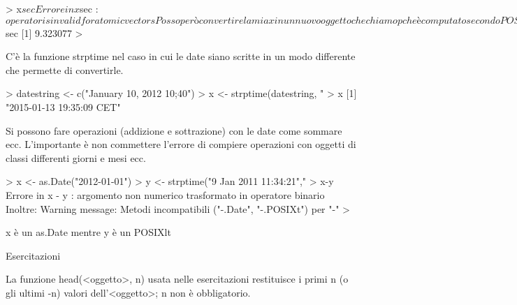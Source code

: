> x$sec
Errore in x$sec : $ operator is invalid for atomic vectors

Posso però convertire la mia x in un nuovo oggetto che chiamo p che è computato secondo POSIXlt dal quale è possibile estrarre i secondi chiamandoli in modo nominale con il dollaro.

> p<-as.POSIXlt(x)
> p$sec
[1] 9.323077
> 

C'è la funzione strptime nel caso in cui le date siano scritte in un modo differente che permette di convertirle.

> datestring <- c("January 10, 2012 10;40")
> x <- strptime(datestring, "%
> x
[1] "2015-01-13 19:35:09 CET"

Si possono fare operazioni (addizione e sottrazione) con le date come sommare ecc.
L'importante è non commettere l'errore di compiere operazioni con oggetti di classi differenti giorni e mesi ecc.

> x <- as.Date("2012-01-01")
> y <- strptime("9 Jan 2011 11:34:21","%
> x-y
Errore in x - y : argomento non numerico trasformato in operatore binario
Inoltre: Warning message:
Metodi incompatibili ("-.Date", "-.POSIXt") per "-" 
> 

x è un as.Date mentre y è un POSIXlt


Esercitazioni

La funzione head(<oggetto>, n) usata nelle esercitazioni restituisce i primi n (o gli ultimi -n) valori dell'<oggetto>; n non è obbligatorio.


